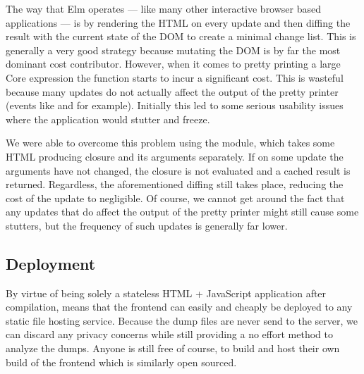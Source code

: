 The way that Elm operates --- like many other interactive browser based applications --- is by rendering the HTML on every
update and then diffing the result with the current state of the DOM to create a minimal change list. This is generally a very
good strategy because mutating the DOM is by far the most dominant cost contributor. However, when it comes to pretty printing a
large Core expression the  function starts to incur a significant cost. This is wasteful because many updates do not
actually affect the output of the pretty printer (events like  and  for example).
Initially this led to some serious usability issues where the application would stutter and freeze.

We were able to overcome this problem using the  module, which takes some HTML producing closure and its arguments
separately. If on some update the arguments have not changed, the closure is not evaluated and a cached result is returned. Regardless,
the aforementioned diffing still takes place, reducing the cost of the update to negligible. Of course, we cannot get around the fact that
any updates that do affect the output of the pretty printer might still cause some stutters, but the frequency of such updates is 
generally far lower.

\subsection{Deployment}

By virtue of being solely a stateless HTML + JavaScript application after compilation, means that the frontend can
easily and cheaply be deployed to any static file hosting service. Because the dump files are never send to the server,
we can discard any privacy concerns while still providing a no effort method to analyze the dumps. Anyone is still free
of course, to build and host their own build of the frontend which is similarly open sourced.


